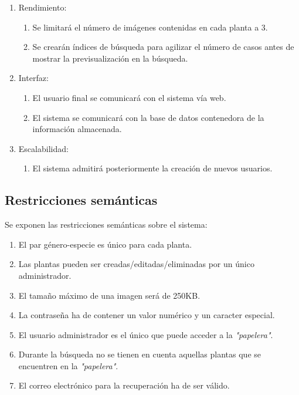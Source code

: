 \documentclass[10pt,a4paper]{article}
\begin{document}
\begin{enumerate}[label=RNF\arabic*. ,leftmargin=3.2\parindent]
	
	\item Rendimiento:
		\begin{enumerate}[label=-]
			\item Se limitará el número de imágenes contenidas en cada planta a 3.
			\item Se crearán índices de búsqueda para agilizar el número de casos antes de mostrar la previsualización en la búsqueda.
		    
		\end{enumerate}
		
	\item Interfaz:
		\begin{enumerate}[label=-]
			\item El usuario final se comunicará con el sistema vía web.
			\item El sistema se comunicará con la base de datos contenedora de la información almacenada.
		\end{enumerate}
	
	\item Escalabilidad:
		\begin{enumerate}[label=-]
			\item El sistema admitirá posteriormente la creación de nuevos usuarios.
		\end{enumerate}
	
\end{enumerate}

\subsection{\textbf{Restricciones semánticas}}

Se exponen las restricciones semánticas sobre el sistema:
\newline

\begin{enumerate}[label=RS\arabic*. ,leftmargin=2.8\parindent]
	
	\item El par género-especie es único para cada planta.
	\item Las plantas pueden ser creadas/editadas/eliminadas por un único administrador.
	\item El tamaño máximo de una imagen será de 250KB.
	\item La contraseña ha de contener un valor numérico y un caracter especial.
	\item El usuario administrador es el único que puede acceder a la \textit{"papelera"}.
	\item Durante la búsqueda no se tienen en cuenta aquellas plantas que se encuentren en la \textit{"papelera"}.
	\item El correo electrónico para la recuperación ha de ser válido.
	
\end{enumerate}
\newpage 
\end{document}
